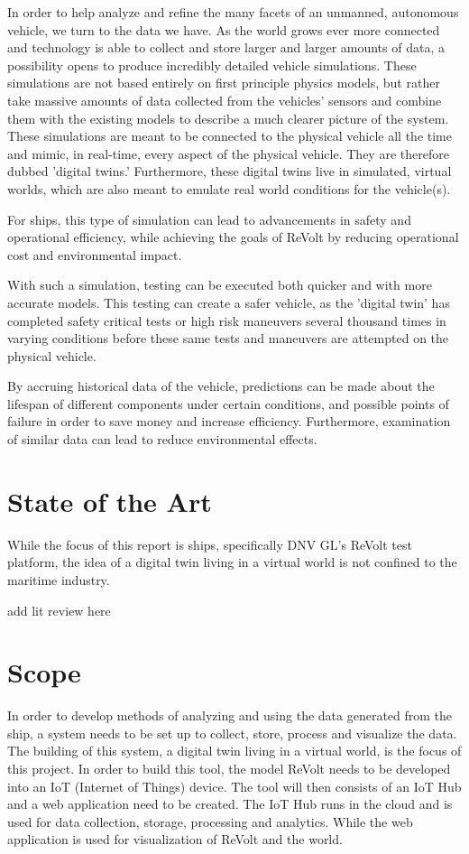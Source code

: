 In order to help analyze and refine the many facets of an unmanned, autonomous vehicle, we turn to the data we have. As the world grows ever more connected and technology is able to collect and store larger and larger amounts of data, a possibility opens to produce incredibly detailed vehicle simulations. These simulations are not based entirely on first principle physics models, but rather take massive amounts of data collected from the vehicles' sensors and combine them with the existing models to describe a much clearer picture of the system. These simulations are meant to be connected to the physical vehicle all the time and mimic, in real-time, every aspect of the physical vehicle. They are therefore dubbed 'digital twins.' Furthermore, these digital twins live in simulated, virtual worlds, which are also meant to emulate real world conditions for the vehicle(s).

For ships, this type of simulation can lead to advancements in safety and operational efficiency, while achieving the goals of ReVolt by reducing operational cost and environmental impact. 

With such a simulation, testing can be executed both quicker and with more accurate models. This testing can create a safer vehicle, as the 'digital twin' has completed safety critical tests or high risk maneuvers several thousand times in varying conditions before these same tests and maneuvers are attempted on the physical vehicle.

By accruing historical data of the vehicle, predictions can be made about the lifespan of different components under certain conditions, and possible points of failure in order to save money and increase efficiency. Furthermore, examination of similar data can lead to reduce environmental effects.

\section{State of the Art}
While the focus of this report is ships, specifically DNV GL's ReVolt test platform, the idea of a digital twin living in a virtual world is not confined to the maritime industry. 

add lit review here

\section{Scope}
In order to develop methods of analyzing and using the data generated from the ship, a system needs to be set up to collect, store, process and visualize the data. The building of this system, a digital twin living in a virtual world, is the focus of this project. In order to build this tool, the model ReVolt needs to be developed into an IoT (Internet of Things) device. The tool will then consists of an IoT Hub and a web application need to be created. The IoT Hub runs in the cloud and is used for data collection, storage, processing and analytics. While the web application is used for visualization of ReVolt and the world.

